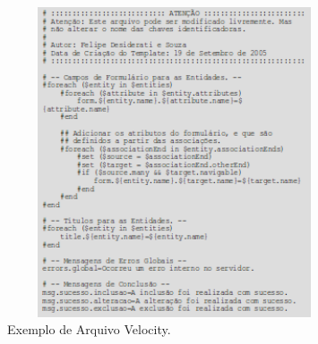 \begin{figure}[H]
	\centering
	\includegraphics[width=280pt,height=260pt]{files/imgs/apendice-cartucho-novo-00005.png}
	\caption{Exemplo de Arquivo Velocity.}
	\label{exemplo_velocity}
\end{figure}
